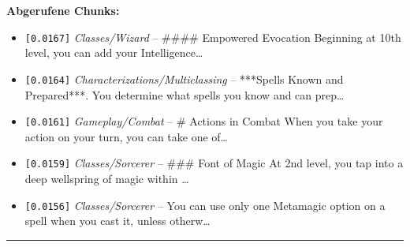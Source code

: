 \noindent\textbf{Abgerufene Chunks:}
\begin{itemize}[noitemsep, topsep=2pt]
  \item[\textbf{\#1}] \texttt{[0.0167]} \textit{Classes/Wizard} -- \#\#\#\# Empowered Evocation  Beginning at 10th level, you can add your Intelligence\ldots
  \item[\textbf{\#2}] \texttt{[0.0164]} \textit{Characterizations/Multiclassing} -- ***Spells Known and Prepared***. You determine what spells you know and can prep\ldots
  \item[\textbf{\#3}] \texttt{[0.0161]} \textit{Gameplay/Combat} -- \# Actions in Combat  When you take your action on your turn, you can take one of\ldots
  \item[\textbf{\#4}] \texttt{[0.0159]} \textit{Classes/Sorcerer} -- \#\#\# Font of Magic  At 2nd level, you tap into a deep wellspring of magic within \ldots
  \item[\textbf{\#5}] \texttt{[0.0156]} \textit{Classes/Sorcerer} -- You can use only one Metamagic option on a spell when you cast it, unless otherw\ldots
\end{itemize}
\vspace{4pt}
\hrule
\vspace{6pt}
